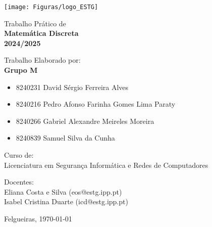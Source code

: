\begin{titlepage}%

	\begin{flushright}
	\texttt{[image: Figuras/logo\_ESTG]}
	\end{flushright}
	
	\vfill
	
  \begin{center}
  \Large{Trabalho Prático de }\\
  \Huge{\textbf{Matemática Discreta}}\\
  \Huge{\textbf{2024/2025}}
  	\end{center}  
  	
  	\vfill  	
  	\vfill
  	\vfill  	
  	\vfill
  	
  	Trabalho Elaborado por:\\
  	\textbf{Grupo M}
  	\begin{itemize}
  	    \item[] 
  	    8240231 David Sérgio Ferreira Alves
  	    \item []
  	    8240216 Pedro Afonso Farinha Gomes Lima Paraty
  	    \item[]
  	    8240266 Gabriel Alexandre Meireles Moreira
  	    \item[]
  	    8240839 Samuel Silva da Cunha
  	\end{itemize}
  	Curso de:\\
 \textsf{Licenciatura em Segurança Informática e Redes de Computadores}
	
  	\vfill  	
  	\vfill
  	
  	
  	
  	
  	Docentes:\\
  Eliana Costa e Silva (eos@estg.ipp.pt) \\
  Isabel Cristina Duarte (icd@estg.ipp.pt) 

	\begin{center}
  Felgueiras, \today
  	\end{center}  
        
\end{titlepage}%